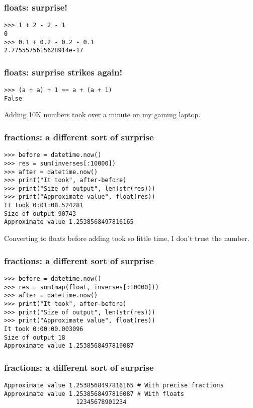 
\begin{frame}[fragile]
\frametitle{floats: surprise!}

\begin{lstlisting}
>>> 1 + 2 - 2 - 1
0
>>> 0.1 + 0.2 - 0.2 - 0.1
2.7755575615628914e-17
\end{lstlisting}

\end{frame}

\begin{frame}[fragile]
\frametitle{floats: surprise strikes again!}

\begin{lstlisting}
>>> (a + a) + 1 == a + (a + 1)
False
\end{lstlisting}
\end{frame}

Adding 10K numbers took over a minute on my gaming laptop.

\begin{frame}[fragile]
\frametitle{fractions: a different sort of surprise}

\begin{lstlisting}
>>> before = datetime.now()
>>> res = sum(inverses[:10000])
>>> after = datetime.now()
>>> print("It took", after-before)
>>> print("Size of output", len(str(res)))
>>> print("Approximate value", float(res))
It took 0:01:08.524281
Size of output 90743
Approximate value 1.2538568497816165
\end{lstlisting}
\end{frame}

Converting to floats before adding took so little time,
I don't trust the number.

\begin{frame}[fragile]
\frametitle{fractions: a different sort of surprise}

\begin{lstlisting}
>>> before = datetime.now()
>>> res = sum(map(float, inverses[:10000]))
>>> after = datetime.now()
>>> print("It took", after-before)
>>> print("Size of output", len(str(res)))
>>> print("Approximate value", float(res))
It took 0:00:00.003096
Size of output 18
Approximate value 1.2538568497816087
\end{lstlisting}
\end{frame}

\begin{frame}[fragile]
\frametitle{fractions: a different sort of surprise}

\begin{lstlisting}
Approximate value 1.2538568497816165 # With precise fractions
Approximate value 1.2538568497816087 # With floats
                    12345678901234
\end{lstlisting}
\end{frame}




